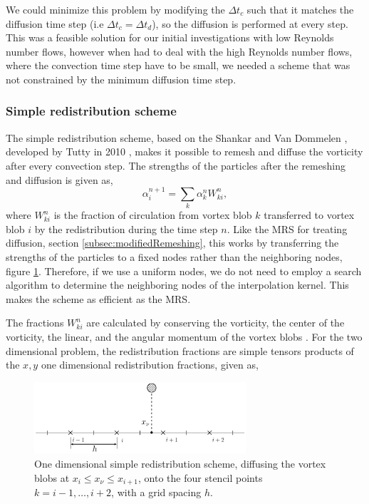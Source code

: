 We could minimize this problem by modifying the $\Delta t_c$ such that it matches the diffusion time step (i.e $\Delta t_c = \Delta t_d$), so the diffusion is performed at every step. This was a feasible solution for our initial investigations with low Reynolds number flows, however when had to deal with the high Reynolds number flows, where the convection time step have to be small, we needed a scheme that was not constrained by the minimum diffusion time step.

\subsubsection*{Simple redistribution scheme}
\label{subsubsec:srs}
The simple redistribution scheme, based on the Shankar and Van Dommelen \cite{Shankar1996}, developed by Tutty in 2010 \cite{Tutty2010a}, makes it possible to remesh and diffuse the vorticity after every convection step. The strengths of the particles after the remeshing and diffusion is given as, 
	\begin{equation}
	\alpha_i^{n+1} = \sum_k \alpha_k^n W_{ki}^n, 
	\end{equation}
where $W_{ki}^n$ is the fraction of circulation from vortex blob $k$ transferred to vortex blob $i$ by the redistribution during the time step $n$. Like the MRS for treating diffusion, section \ref{subsec:modifiedRemeshing}, this  works by transferring the strengths of the particles to a fixed nodes rather than the neighboring nodes, figure \ref{fig:simpleRedistribution}. Therefore, if we use a uniform nodes, we do not need to employ a search algorithm to determine the neighboring nodes of the interpolation kernel. This makes the scheme as efficient as the MRS.

The fractions $W_{ki}^n$ are calculated by conserving the vorticity, the center of the vorticity, the linear, and the angular momentum of the vortex blobs \cite{Tutty2010a}. For the two dimensional problem, the redistribution fractions are simple tensors products of the $x,y$ one dimensional redistribution fractions, given as,

	\begin{figure}[t]
	\centering
	\includegraphics[width=0.7\textwidth]{figures/lagrangian/simpleRedistribution.pdf}
	\caption{One dimensional simple redistribution scheme, diffusing the vortex blobs at $x_i \leqslant x_{\nu} \leqslant x_{i+1}$, onto the four stencil points $k=i-1,\dots,i+2$, with a grid spacing $h$.}
	\label{fig:simpleRedistribution}
	\end{figure}

